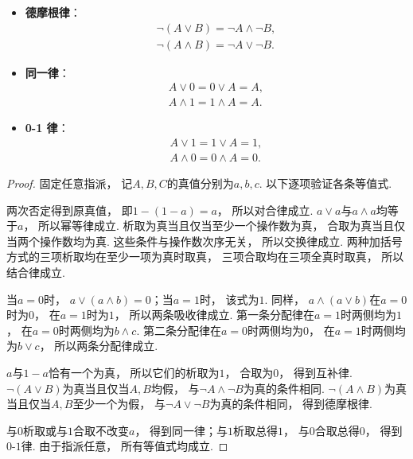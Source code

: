 \begin{theorem}
\begin{itemize}
	\item {\rm\bf 德摩根律}：\begin{gather}
		\neg(A \lor B) = \neg A \land \neg B, \\
		\neg(A \land B) = \neg A \lor \neg B.
	\end{gather}

	\item {\rm\bf 同一律}：\begin{gather}
		A \lor 0 = 0 \lor A = A, \\
		A \land 1 = 1 \land A = A.
	\end{gather}

	\item {\rm\bf 0-1 律}：\begin{gather}
		A \lor 1 = 1 \lor A = 1, \\
		A \land 0 = 0 \land A = 0.
	\end{gather}
\end{itemize}
    \begin{proof}
        固定任意指派，
        记\(A,B,C\)的真值分别为\(a,b,c\).
        以下逐项验证各条等值式.

        两次否定得到原真值，
        即\(1-(1-a)=a\)，
        所以对合律成立.
        \(a\lor a\)与\(a\land a\)均等于\(a\)，
        所以幂等律成立.
        析取为真当且仅当至少一个操作数为真，
        合取为真当且仅当两个操作数均为真.
        这些条件与操作数次序无关，
        所以交换律成立.
        两种加括号方式的三项析取均在至少一项为真时取真，
        三项合取均在三项全真时取真，
        所以结合律成立.

        当\(a=0\)时，
        \(a\lor(a\land b)=0\)；当\(a=1\)时，
        该式为\(1\).
        同样，
        \(a\land(a\lor b)\)在\(a=0\)时为\(0\)，
        在\(a=1\)时为\(1\)，
        所以两条吸收律成立.
        第一条分配律在\(a=1\)时两侧均为\(1\)，
        在\(a=0\)时两侧均为\(b\land c\).
        第二条分配律在\(a=0\)时两侧均为\(0\)，
        在\(a=1\)时两侧均为\(b\lor c\)，
        所以两条分配律成立.

        \(a\)与\(1-a\)恰有一个为真，
        所以它们的析取为\(1\)，
        合取为\(0\)，
        得到互补律.
        \(\neg(A\lor B)\)为真当且仅当\(A,B\)均假，
        与\(\neg A\land\neg B\)为真的条件相同.
        \(\neg(A\land B)\)为真当且仅当\(A,B\)至少一个为假，
        与\(\neg A\lor\neg B\)为真的条件相同，
        得到德摩根律.

        与\(0\)析取或与\(1\)合取不改变\(a\)，
        得到同一律；与\(1\)析取总得\(1\)，
        与\(0\)合取总得\(0\)，
        得到\(0\)-\(1\)律.
        由于指派任意，
        所有等值式均成立.
    \end{proof}
\end{theorem}

